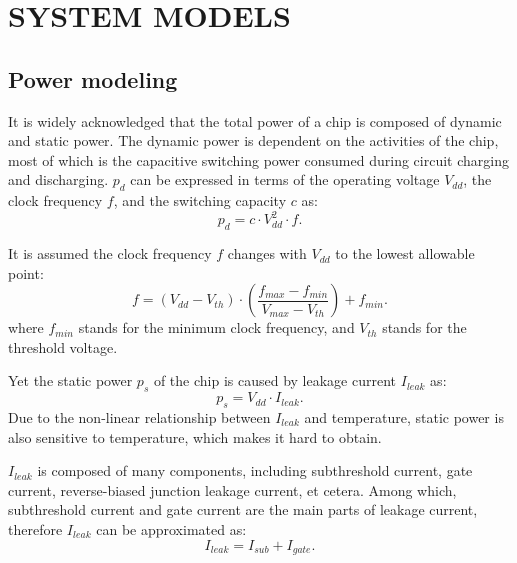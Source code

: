 \section{SYSTEM MODELS}

\subsection{Power modeling}

It is widely acknowledged that the total power of a chip is composed of dynamic and static power. The dynamic power is dependent on the activities of the chip, most of which is the capacitive switching power consumed during circuit charging and discharging. $p_{d}$ can be expressed in terms of the operating voltage $V_{dd}$, the clock frequency $f$, and the switching capacity $c$ as:
\begin{equation}\label{eq:dyn_power}
p_{d} = c \cdot V_{dd}^{2} \cdot f.
\end{equation}

It is assumed the clock frequency $f$ changes with $V_{dd}$ to the lowest allowable point:
\begin{equation}\label{eq:f_v}
f = (V_{dd}-V_{th}) \cdot (\frac{f_{max}-f_{min}}{V_{max}-V_{th}})+f_{min}.
\end{equation}
where $f_{min}$ stands for the minimum clock frequency, and $V_{th}$ stands for the threshold voltage.

Yet the static power $p_{s}$ of the chip is caused by leakage current $I_{leak}$ as:
\begin{equation}\label{eq:sta_power}
p_{s} = V_{dd} \cdot I_{leak}.
\end{equation}
Due to the non-linear relationship between $I_{leak}$ and temperature, static power is also sensitive to temperature, which makes it hard to obtain. 

$I_{leak}$ is composed of many components, including subthreshold current, gate current, reverse-biased junction leakage current, et cetera. Among which, subthreshold current and gate current are the main parts of leakage current, therefore $I_{leak}$ can be approximated as:
\begin{equation}\label{eq:leakage}
I_{leak}=I_{sub}+I_{gate}.
\end{equation}

